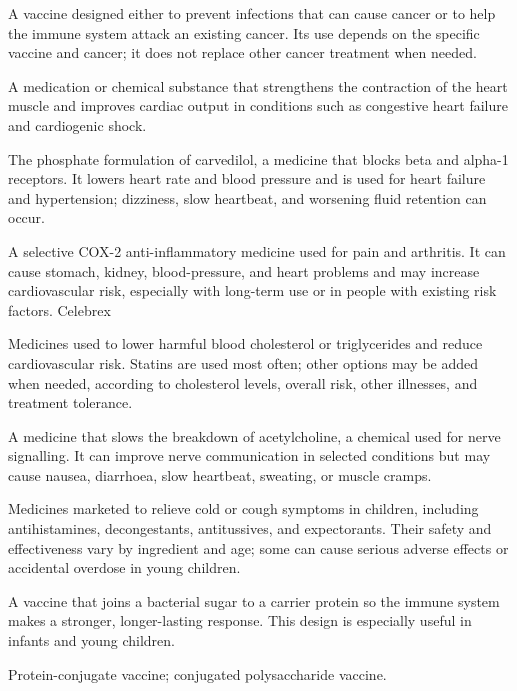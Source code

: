  A vaccine designed either to prevent infections that can cause cancer or to help the immune system attack an existing cancer. Its use depends on the specific vaccine and cancer; it does not replace other cancer treatment when needed.

 A medication or chemical substance that strengthens the contraction of the heart muscle and improves cardiac output in conditions such as congestive heart failure and cardiogenic shock.


 The phosphate formulation of carvedilol, a medicine that blocks beta and alpha-1 receptors. It lowers heart rate and blood pressure and is used for heart failure and hypertension; dizziness, slow heartbeat, and worsening fluid retention can occur.



 A selective COX-2 anti-inflammatory medicine used for pain and arthritis. It can cause stomach, kidney, blood-pressure, and heart problems and may increase cardiovascular risk, especially with long-term use or in people with existing risk factors.
\synonyms
Celebrex

 Medicines used to lower harmful blood cholesterol or triglycerides and reduce cardiovascular risk. Statins are used most often; other options may be added when needed, according to cholesterol levels, overall risk, other illnesses, and treatment tolerance.

 A medicine that slows the breakdown of acetylcholine, a chemical used for nerve signalling. It can improve nerve communication in selected conditions but may cause nausea, diarrhoea, slow heartbeat, sweating, or muscle cramps.

 Medicines marketed to relieve cold or cough symptoms in children, including antihistamines, decongestants, antitussives, and expectorants. Their safety and effectiveness vary by ingredient and age; some can cause serious adverse effects or accidental overdose in young children.


 A vaccine that joins a bacterial sugar to a carrier protein so the immune system makes a stronger, longer-lasting response. This design is especially useful in infants and young children.

\synonyms
Protein-conjugate vaccine; conjugated polysaccharide vaccine.

